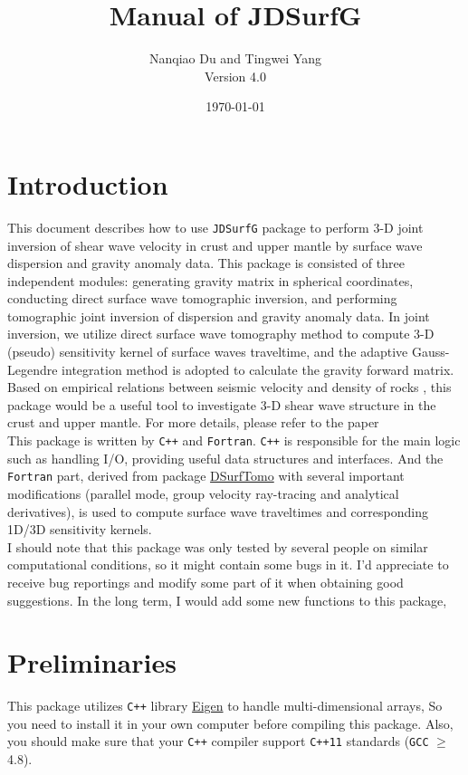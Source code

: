 \documentclass[UTF8]{article}
\title{\textbf{Manual of JDSurfG}}
\author{Nanqiao Du and Tingwei Yang \\ Version 4.0}
\date{\today}
\begin{document}
\maketitle
\tableofcontents
\newpage


\section{Introduction}
This document describes how to use \texttt{JDSurfG} package 
to perform 3-D joint inversion of shear wave velocity
in crust and upper mantle by surface wave dispersion and
gravity anomaly data. This package is consisted of three
independent modules: generating gravity matrix in spherical
coordinates, conducting direct surface wave tomographic 
inversion, and performing tomographic joint inversion of 
dispersion and gravity anomaly data. In joint inversion, we
utilize direct surface wave tomography method \citep{Fang2015}
to compute 3-D (pseudo) sensitivity kernel of surface waves
traveltime, and the adaptive Gauss-Legendre integration 
method \citep{RN35} is adopted to calculate the gravity 
forward matrix. Based on empirical relations between seismic
velocity and density of rocks \citep{Brocher05}, this 
package would be a useful tool to investigate 3-D shear 
wave structure in the crust and upper mantle. For more details, 
please refer to the paper \citep{Du2021} \\

This package is written by \texttt{C++} and \texttt{Fortran}.
\texttt{C++} is responsible for the main logic such as 
handling I/O, providing useful data structures and 
interfaces. And the \texttt{Fortran} part, derived from 
package \href{https://github.com/HongjianFang/DSurfTomo/tree/stable/src}{DSurfTomo}
with several important modifications (parallel mode, group velocity ray-tracing and analytical derivatives), is used to 
compute surface wave traveltimes and corresponding 1D/3D 
sensitivity kernels.\\

I should note that this package was only tested by 
several people on similar computational conditions, 
so it might contain some bugs in it. I'd appreciate 
to receive bug reportings and modify some part of 
it when obtaining good suggestions. In the long term, 
I would add some new functions to this package, 

\section{Preliminaries}
This package utilizes \texttt{C++} library \href{http://eigen.tuxfamily.org/index.php?title=Main_Page}{Eigen}
to handle multi-dimensional arrays, So you need 
to install it in your own computer before
compiling this package. Also, you should make sure
that your \texttt{C++} compiler support \texttt{C++11}
standards (\texttt{GCC} $\geq$ 4.8).
\end{document}
